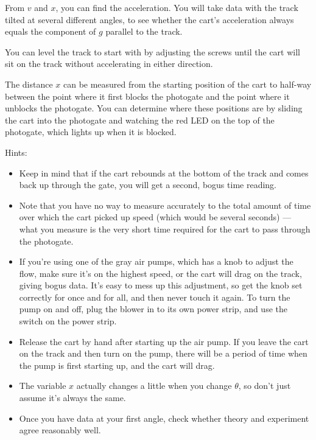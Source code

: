 From $v$ and $x$, you can find the
acceleration.  You will take data with the track tilted at
several different angles, to see whether the cart's
acceleration always equals the component of  $g$ parallel to the track.

You can level the track to start with by adjusting the
screws until the cart will sit on the track without
accelerating in either direction.

The distance $x$ can be measured from the starting position
of the cart to half-way between the point where it first
blocks the photogate and the point where it unblocks the
photogate.  You can determine where these positions are by
sliding the cart into the photogate and watching the red LED
on the top of the photogate, which lights up when it is blocked.

Hints:

\begin{itemize}
\item[] Keep in mind that if the cart rebounds at the bottom of
the track and comes back up through the gate, you will get a
second, bogus time reading.

\item[] Note that you have no way to measure accurately to the
total amount of time over which the cart picked up speed
(which would be several seconds) --- what you measure is the
very short time required for the cart to pass through the photogate.

\item[] If you're using one of the gray air pumps, which has a knob
to adjust the flow, make sure it's on the highest speed, or the
cart will drag on the track, giving bogus data. It's easy to mess up
this adjustment, so get the knob set correctly for once and for all,
and then never touch it again. To turn the pump
on and off, plug the blower in to its own power strip, and
use the switch on the power strip.

\item[] Release the cart by hand after starting up the air pump.
If you leave the cart on the track and then turn on the pump, there
will be a period of time when the pump is first starting up, and
the cart will drag.

\item[] The variable $x$ actually changes a little when you change $\theta$,
so don't just assume it's always the same.

\item[] Once you have data at your first angle, check whether theory and experiment
agree reasonably well.
\end{itemize}

